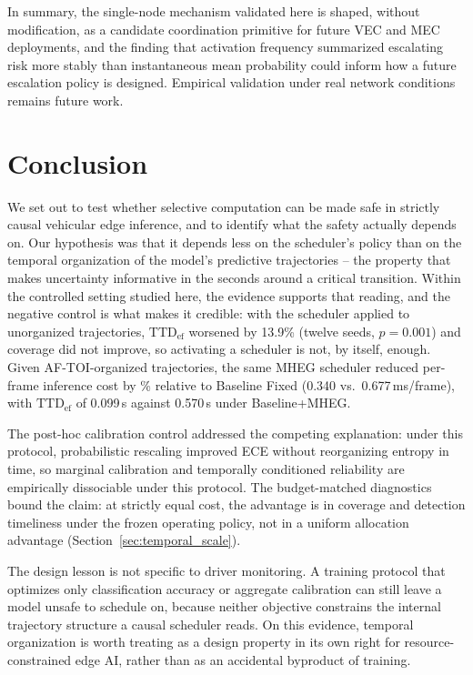 \documentclass[a4paper,fleqn]{cas-dc}
\newcommand{\MHEG}{\mbox{MHEG}\xspace}
\begin{document}
In summary, the single-node mechanism validated here is shaped, without
modification, as a candidate coordination primitive for future VEC and MEC
deployments, and the finding that activation frequency summarized escalating
risk more stably than instantaneous mean probability could inform how a future
escalation policy is designed. Empirical validation under real network
conditions remains future work.
\section{Conclusion}
\label{sec:conclusao}
We set out to test whether selective computation can be made safe in strictly
causal vehicular edge inference, and to identify what the safety actually
depends on. Our hypothesis was that it depends less on the scheduler's policy than
on the temporal organization of the model's predictive trajectories -- the property
that makes uncertainty informative in the seconds around a critical transition.
Within the controlled setting studied here, the evidence supports that reading, and
the negative control is what makes it credible: with the scheduler applied to
unorganized trajectories, $\mathrm{TTD}_{\mathrm{ef}}$ worsened by
{\color{\revcolor}13.9\% (twelve seeds, $p=0.001$)} and
coverage did not improve, so activating a scheduler is not, by itself, enough.
{\color{\revcolor}Given \mbox{AF-TOI}-organized trajectories, the same \MHEG
scheduler reduced per-frame inference cost by \CostReduction\% relative to
Baseline Fixed (0.340 vs.\ 0.677\,ms/frame), with
$\mathrm{TTD}_{\mathrm{ef}}$ of 0.099\,s against 0.570\,s under
Baseline+MHEG}.

The post-hoc calibration control addressed the competing
explanation: under this protocol, probabilistic rescaling improved ECE without
reorganizing entropy in time, so marginal calibration and temporally
conditioned reliability are empirically dissociable under this protocol.
{\color{\revcolor}The budget-matched diagnostics bound the claim: at strictly
equal cost, the advantage is in coverage and detection timeliness under the
frozen operating policy, not in a uniform allocation advantage
(Section~\ref{sec:temporal_scale}).}

The design lesson is not specific to driver monitoring. A training protocol that
optimizes only classification accuracy or aggregate calibration can still leave a
model unsafe to schedule on, because neither objective constrains the internal
trajectory structure a causal scheduler reads. On this evidence, temporal
organization is worth treating as a design property in its own right for
resource-constrained edge AI, rather than as an accidental byproduct of training.
\end{document}
